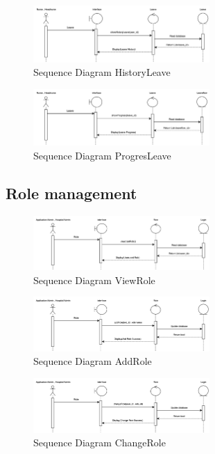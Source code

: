     \begin{figure}[h]
    \centering
    \includegraphics[width=0.6\textwidth]{Sequence 7.4.png}
    \caption{Sequence Diagram HistoryLeave}
    \end{figure}

    \begin{figure}[h]
    \centering
    \includegraphics[width=0.6\textwidth]{Sequence 7.5.png}
    \caption{Sequence Diagram ProgresLeave}
    \end{figure}

\subsection{Role management}

\begin{figure}[h]
    \centering
    \includegraphics[width=0.6\textwidth]{Sequence 8.1.png}
    \caption{Sequence Diagram ViewRole}
    \end{figure}

    \begin{figure}[h]
    \centering
    \includegraphics[width=0.6\textwidth]{Sequence 8.2.png}
    \caption{Sequence Diagram AddRole}
    \end{figure}

    \begin{figure}[h]
    \centering
    \includegraphics[width=0.6\textwidth]{Sequence 8.3.png}
    \caption{Sequence Diagram ChangeRole}
    \end{figure}

